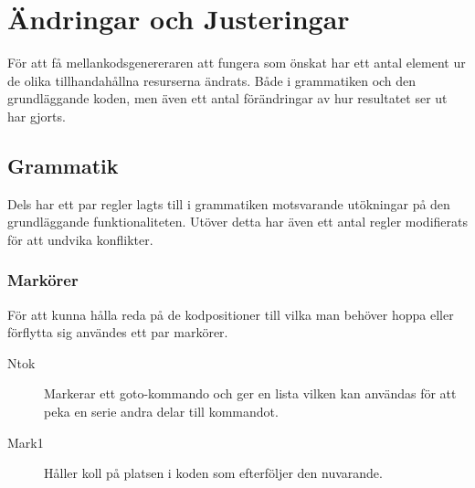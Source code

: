 

\section{ Ändringar och Justeringar }
	För att få mellankodsgenereraren att fungera som önskat har ett antal 
	element ur de olika tillhandahållna resurserna ändrats. Både i grammatiken
	och den grundläggande koden, men även ett antal förändringar av hur
	resultatet ser ut har gjorts.

	\subsection{Grammatik}
		Dels har ett par regler lagts till i grammatiken motsvarande utökningar
		på den grundläggande funktionaliteten. Utöver detta har även ett antal regler 
		modifierats för att undvika konflikter.

		\subsubsection{Markörer}
			För att kunna hålla reda på de kodpositioner till vilka man behöver hoppa eller
			förflytta sig användes ett par markörer.\\

			\begin{description}
				\item[Ntok]	 Markerar ett goto-kommando och ger en lista vilken kan användas för att peka en serie andra delar till kommandot.
				\item[Mark1] Håller koll på platsen i koden som efterföljer den nuvarande.
			\end{description}

